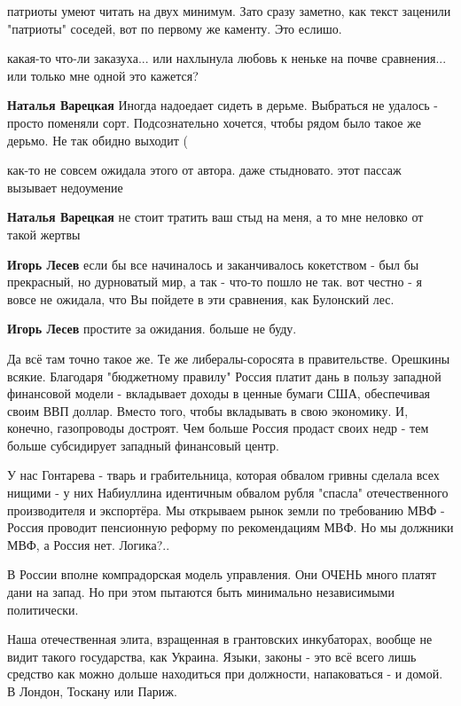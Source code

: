 \begin{itemize}
\begin{itemize} %
патриоты умеют читать на двух минимум.
Зато сразу заметно, как текст заценили "патриоты" соседей, вот по первому же каменту.
Это еслишо.

какая-то что-ли заказуха... или нахлынула любовь к неньке на почве сравнения... или только мне одной это кажется?

\textbf{Наталья Варецкая} Иногда надоедает сидеть в дерьме. Выбраться не удалось - просто поменяли сорт. Подсознательно хочется, чтобы рядом было такое же дерьмо. Не так обидно выходит (

как-то не совсем ожидала этого от автора.
даже стыдновато.
этот пассаж вызывает недоумение

\textbf{Наталья Варецкая} не стоит тратить ваш стыд на меня, а то мне неловко от такой жертвы

\textbf{Игорь Лесев} если бы все начиналось и заканчивалось кокетством - был бы прекрасный, но дурноватый мир, а так - что-то пошло не так.
вот честно - я вовсе не ожидала, что Вы пойдете в эти сравнения, как Булонский лес.

\textbf{Игорь Лесев} простите за ожидания. больше не буду.
\end{itemize} %


Да всё там точно такое же. Те же либералы-соросята в правительстве. Орешкины
всякие. Благодаря "бюджетному правилу" Россия платит дань в пользу западной
финансовой модели - вкладывает доходы в ценные бумаги США, обеспечивая своим
ВВП доллар. Вместо того, чтобы вкладывать в свою экономику. И, конечно,
газопроводы достроят. Чем больше Россия продаст своих недр - тем больше
субсидирует западный финансовый центр.

У нас Гонтарева - тварь и грабительница, которая обвалом гривны сделала всех
нищими - у них Набиуллина идентичным обвалом рубля "спасла" отечественного
производителя и экспортёра. Мы открываем рынок земли по требованию МВФ - Россия
проводит пенсионную реформу по рекомендациям МВФ. Но мы должники МВФ, а Россия
нет. Логика?..

В России вполне компрадорская модель управления. Они ОЧЕНЬ много платят дани на
запад. Но при этом пытаются быть минимально независимыми политически.

Наша отечественная элита, взращенная в грантовских инкубаторах, вообще не видит
такого государства, как Украина. Языки, законы - это всё всего лишь средство
как можно дольше находиться при должности, напаковаться - и домой. В Лондон,
Тоскану или Париж.


\end{itemize}
